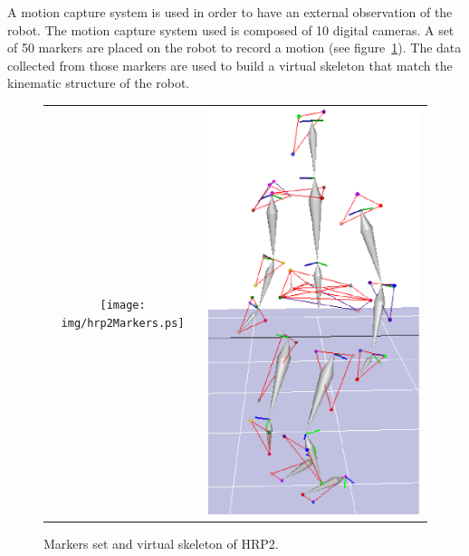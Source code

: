 \documentclass[letterpaper, 10pt, conference]{ieeeconf}      %
\begin{document}
A motion capture system is used in order to have an external observation of the robot.
The motion capture system used is composed of 10 digital cameras. A set of 50 markers
are placed on the robot to record a motion (see figure~\ref{fig:hrp2Markers}). The data collected from those markers
are used to build a virtual skeleton that match the kinematic structure of the robot.
\begin{figure}[t]
\centering
\begin{tabular}{cc}
\parbox[c]{3.6cm}{\texttt{[image: img/hrp2Markers.ps]}} &
\parbox[c]{3.45cm}{\includegraphics[width=\linewidth]{img/skel.ps}} \\
\end{tabular}
\caption{Markers set and virtual skeleton of HRP2.}
\label{fig:hrp2Markers}
\end{figure}
\end{document}
